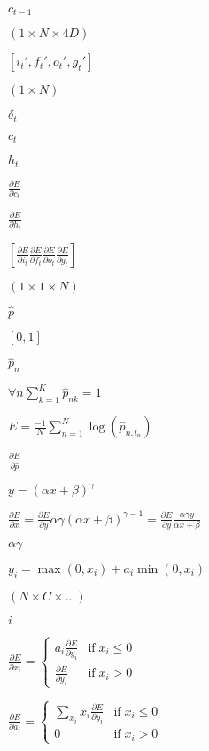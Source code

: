 \documentclass{article}
\begin{document}
$ c_{t-1} $
\pagebreak

$ (1 \times N \times 4D) $
\pagebreak

$ [i_t', f_t', o_t', g_t'] $
\pagebreak

$ (1 \times N) $
\pagebreak

$ \delta_t $
\pagebreak

$ c_t $
\pagebreak

$ h_t $
\pagebreak

$ \frac{\partial E}{\partial c_t} $
\pagebreak

$ \frac{\partial E}{\partial h_t} $
\pagebreak

$ [ \frac{\partial E}{\partial i_t} \frac{\partial E}{\partial f_t} \frac{\partial E}{\partial o_t} \frac{\partial E}{\partial g_t} ] $
\pagebreak

$ (1 \times 1 \times N) $
\pagebreak

$ \hat{p} $
\pagebreak

$ [0, 1] $
\pagebreak

$ \hat{p}_n $
\pagebreak

$ \forall n \sum\limits_{k=1}^K \hat{p}_{nk} = 1 $
\pagebreak

$ E = \frac{-1}{N} \sum\limits_{n=1}^N \log(\hat{p}_{n,l_n}) $
\pagebreak

$ \frac{\partial E}{\partial \hat{p}} $
\pagebreak

$ y = (\alpha x + \beta) ^ \gamma $
\pagebreak

$ \frac{\partial E}{\partial x} = \frac{\partial E}{\partial y} \alpha \gamma (\alpha x + \beta) ^ {\gamma - 1} = \frac{\partial E}{\partial y} \frac{\alpha \gamma y}{\alpha x + \beta} $
\pagebreak

$ \alpha \gamma $
\pagebreak

$ y_i = \max(0, x_i) + a_i \min(0, x_i) $
\pagebreak

$ (N \times C \times ...) $
\pagebreak

$i$
\pagebreak

$ \frac{\partial E}{\partial x_i} = \left\{ \begin{array}{lr} a_i \frac{\partial E}{\partial y_i} & \mathrm{if} \; x_i \le 0 \\ \frac{\partial E}{\partial y_i} & \mathrm{if} \; x_i > 0 \end{array} \right. $
\pagebreak

$ \frac{\partial E}{\partial a_i} = \left\{ \begin{array}{lr} \sum_{x_i} x_i \frac{\partial E}{\partial y_i} & \mathrm{if} \; x_i \le 0 \\ 0 & \mathrm{if} \; x_i > 0 \end{array} \right. $
\pagebreak
\end{document}
